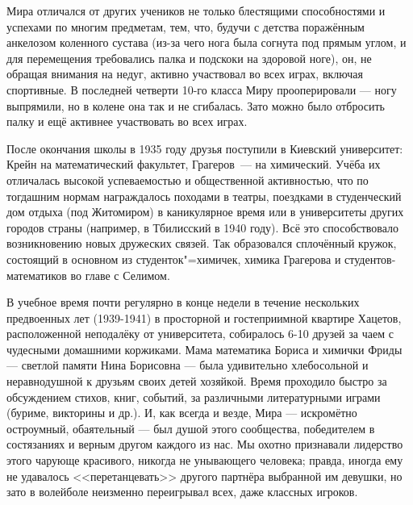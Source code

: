 Мира отличался от других учеников не только блестящими способностями и успехами по многим предметам, тем, что, будучи с детства поражённым анкелозом коленного сустава (из-за чего нога была согнута под прямым углом, и для перемещения требовались палка и подскоки на здоровой ноге), он, не обращая внимания на недуг, активно участвовал во всех играх, включая спортивные. В последней четверти 10-го класса Миру прооперировали --- ногу выпрямили, но в колене она так и не сгибалась. Зато можно было отбросить палку и ещё активнее участвовать во всех играх.

После окончания школы в 1935 году друзья поступили в Киевский университет:
Крейн на математический факультет, Грагеров~--- на химический.
Учёба их отличалась высокой успеваемостью и общественной активностью,
что по тогдашним нормам награждалось походами в театры, поездками в студенческий дом отдыха (под Житомиром)
в каникулярное время или в университеты других городов страны (например, в Тбилисский в 1940 году).
Всё это способствовало возникновению новых дружеских связей.
Так образовался сплочённый кружок, состоящий в основном из сту\-де\-н\-ток"=хи\-ми\-чек,
химика Грагерова и студентов-математиков во главе с Селимом.

В учебное время почти регулярно в конце недели в течение нескольких предвоенных лет (1939-1941) в просторной и гостеприимной квартире Хацетов, расположенной неподалёку от университета, собиралось 6-10 друзей за чаем с чудесными домашними коржиками. Мама математика Бориса и химички Фриды --- светлой памяти Нина Борисовна --- была удивительно хлебосольной и неравнодушной к друзьям своих детей хозяйкой. Время проходило быстро за обсуждением стихов, книг, событий, за различными литературными играми (буриме, викторины и др.). И, как всегда и везде, Мира --- искромётно остроумный, обаятельный --- был душой этого сообщества, победителем в состязаниях и верным другом каждого из нас. Мы охотно признавали лидерство этого чарующе красивого, никогда не унывающего человека; правда, иногда ему не удавалось <<перетанцевать>> другого партнёра выбранной им девушки, но зато в волейболе неизменно переигрывал всех, даже классных игроков.

